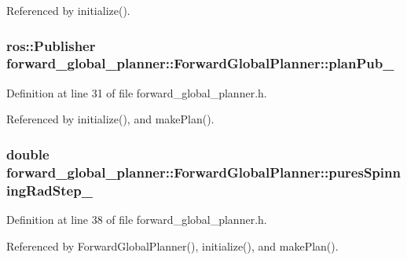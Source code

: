 Referenced by initialize().

\subsubsection[{\texorpdfstring{plan\+Pub\+\_\+}{planPub_}}]{\setlength{\rightskip}{0pt plus 5cm}ros\+::\+Publisher forward\+\_\+global\+\_\+planner\+::\+Forward\+Global\+Planner\+::plan\+Pub\+\_\+\hspace{0.3cm}{\ttfamily [private]}}\hypertarget{classforward__global__planner_1_1ForwardGlobalPlanner_a4b20efe94ece6437775470088095132a}{}\label{classforward__global__planner_1_1ForwardGlobalPlanner_a4b20efe94ece6437775470088095132a}


Definition at line 31 of file forward\+\_\+global\+\_\+planner.\+h.



Referenced by initialize(), and make\+Plan().

\subsubsection[{\texorpdfstring{pures\+Spinning\+Rad\+Step\+\_\+}{puresSpinningRadStep_}}]{\setlength{\rightskip}{0pt plus 5cm}double forward\+\_\+global\+\_\+planner\+::\+Forward\+Global\+Planner\+::pures\+Spinning\+Rad\+Step\+\_\+\hspace{0.3cm}{\ttfamily [private]}}\hypertarget{classforward__global__planner_1_1ForwardGlobalPlanner_aa4247993c6651700fdaf8c067de19d8f}{}\label{classforward__global__planner_1_1ForwardGlobalPlanner_aa4247993c6651700fdaf8c067de19d8f}


Definition at line 38 of file forward\+\_\+global\+\_\+planner.\+h.



Referenced by Forward\+Global\+Planner(), initialize(), and make\+Plan().

